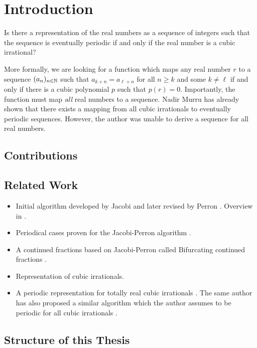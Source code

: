 \chapter{Introduction}

\begin{problem}
  Is there a representation of the real numbers as a sequence of integers such
  that the sequence is eventually periodic if and only if the real number is a
  cubic irrational?
\end{problem}

More formally, we are looking for a function which maps any real number $r$ to
a sequence $(a_n)_{n \in {\mathbb N}}$ such that $a_{k+n} = a_{\ell+n}$ for all $n \ge k$ and
some $k \ne \ell$ if and only if there is a cubic polynomial $p$ such that $p(r) = 0$.
Importantly, the function must map \emph{all} real numbers to a sequence.
Nadir Murru \cite{Murru15} has already shown that there exists a mapping from all
cubic irrationals to eventually periodic sequences.
However, the author was unable to derive a sequence for all real numbers.

\section{Contributions}

\section{Related Work}

\begin{itemize}
  \item Initial algorithm developed by Jacobi \cite{Jacobi68} and later revised
    by Perron \cite{07}. Overview in \cite{Bernstein71}.
  \item
    Periodical cases proven for the Jacobi-Perron algorithm \cite{Bernstein64}.
  \item
    A continued fractions based on Jacobi-Perron called Bifurcating continued
    fractions \cite{Gupta00}.
  \item
    Representation of cubic irrationals. \cite{Murru15}
  \item
    A periodic representation for totally real cubic irrationals \cite{Karpenkov24}.
    The same author has also proposed a similar algorithm which the author
    assumes to be periodic for all cubic irrationals \cite{Karpenkov21}.
\end{itemize}

\section{Structure of this Thesis}
